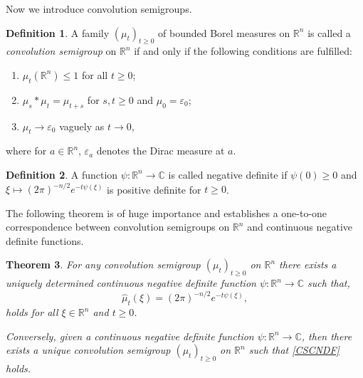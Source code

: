 \documentclass[a4paper, 12pt]{report}
\newtheorem{theorem}{Theorem}[section]
\theoremstyle{remark}
\theoremstyle{definition}
\newtheorem{definition}[theorem]{Definition}
\begin{document}
Now we introduce convolution semigroups.

\begin{definition}
A family $(\mu_t)_{t \ge 0}$ of bounded Borel measures on $\mathbb{R}^n$ is called a \emph{convolution semigroup} on $\mathbb{R}^n$ if and only if the following conditions are fulfilled:
\begin{enumerate}
\item $\mu_t(\mathbb{R}^n) \le 1$ for all $t \ge 0$;

\item $\mu_s \ast \mu_t = \mu_{t + s}$ for $s, t \ge 0$ and $\mu_0 = \varepsilon_0$;

\item $\mu_t \to \varepsilon_0$ vaguely as $t \to 0$,
\end{enumerate}
where for $a \in \mathbb{R}^n$, $\varepsilon_a$ denotes the Dirac measure at $a$.
\end{definition}

\begin{definition}
A function $\psi : \mathbb{R}^n \to \mathbb{C}$ is called negative definite if $\psi(0) \ge 0$ and $\xi \mapsto (2\pi)^{-n/2}e^{-t\psi(\xi)}$ is positive definite for $t \ge 0$.
\end{definition}

The following theorem is of huge importance and establishes a one-to-one correspondence between convolution semigroups on $\mathbb{R}^n$ and continuous negative definite functions.
\begin{theorem}
For any convolution semigroup $(\mu_t)_{t \ge 0}$ on $\mathbb{R}^n$ there exists a uniquely determined continuous negative definite function $\psi : \mathbb{R}^n \to \mathbb{C}$ such that,
\begin{equation}
\hat{\mu}_t(\xi) = (2\pi)^{-n/2}e^{-t\psi(\xi)},\label{CSCNDF}
\end{equation}
holds for all $\xi \in \mathbb{R}^n$ and $t \ge 0$.

Conversely, given a continuous negative definite function $\psi : \mathbb{R}^n \to \mathbb{C}$, then there exists a unique convolution semigroup $(\mu_t)_{t \ge 0}$ on $\mathbb{R}^n$ such that \eqref{CSCNDF} holds.
\end{theorem}
\end{document}
